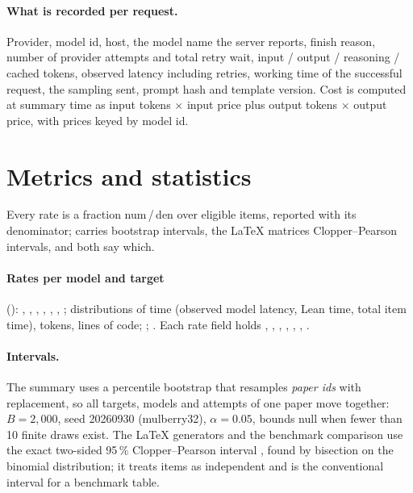\documentclass[11pt,a4paper]{article}
\begin{document}
\paragraph{What is recorded per request.} Provider, model id, host, the model name the server reports, finish reason, number of provider attempts and total retry wait, input / output / reasoning / cached tokens, observed latency including retries, working time of the successful request, the sampling sent, prompt hash and template version. Cost is computed at summary time as input tokens $\times$ input price plus output tokens $\times$ output price, with prices keyed by model id.

\section{Metrics and statistics}
\label{sec:metrics}

Every rate is a fraction num\,/\,den over eligible items, reported with its denominator;  carries bootstrap intervals, the LaTeX matrices Clopper--Pearson intervals, and both say which.

\paragraph{Rates per model and target} (): , , , , , , ; distributions of time (observed model latency, Lean time, total item time), tokens, lines of code; ; . Each rate field holds , , , , , , .

\paragraph{Intervals.} The summary uses a percentile bootstrap \cite{efron1979} that resamples \emph{paper ids} with replacement, so all targets, models and attempts of one paper move together: $B = 2{,}000$, seed 20260930 (mulberry32), $\alpha = 0.05$, bounds null when fewer than 10 finite draws exist. The LaTeX generators and the benchmark comparison use the exact two-sided 95\,\% Clopper--Pearson interval \cite{clopper1934}, found by bisection on the binomial distribution; it treats items as independent and is the conventional interval for a benchmark table.
\end{document}
